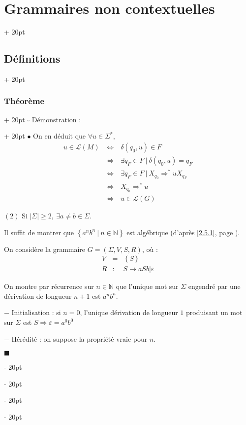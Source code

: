\documentclass[a4paper, 12pt, twoside]{article}
\newcommand{\N}{\mathbb{N}} %
\newcommand{\lr}[1]{\left( #1 \right)}
\newcommand{\set}[1]{\left\{ #1 \right\}}
\newcommand{\abs}[1]{\left\lvert #1 \right\rvert}
\newcommand{\ssi}{\ \Leftrightarrow \ }
\renewcommand{\ge}{\geqslant}
\newcommand{\ind}[1][20pt]{\advance\leftskip + #1}
\newcommand{\deind}[1][20pt]{\advance\leftskip - #1}
\newenvironment{indt}[2][20pt]{#2 \par \ind[#1]}{\par \deind} %
\newenvironment{proof}[1][{Démonstration :}]{\begin{indt}{$\square$ #1}}{$\blacksquare$ \end{indt}}
\begin{document}
\begin{indt}{\section{Grammaires non contextuelles}}
\begin{indt}{\subsection{Définitions}}
\begin{indt}{\subsubsection{Théorème}}
\begin{proof}
                    $\bullet$ On en déduit que $\forall u \in \Sigma^*$,
                    \[
                        \begin{array}{rcl}
                            u \in \mathcal L(M)
                            &\ssi& \delta(q_0, u) \in F
                            \\
                            &\ssi& \exists q_F \in F\ |\ \delta(q_0, u) = q_F
                            \\
                            &\ssi& \exists q_F \in F\ |\ X_{q_0} \Rightarrow^* uX_{q_F}
                            \\
                            &\ssi& X_{q_0} \Rightarrow^* u
                            \\
                            &\ssi& u \in \mathcal L(G)
                        \end{array}
                    \]

                    \vspace{12pt}
                    
                    $(2)$ Si $\abs \Sigma \ge 2,\ \exists a \neq b \in \Sigma$.

                    Il suffit de montrer que $\set{a^n b^n\ |\ n \in \N}$ est algébrique (d'après \ref{2.5.1}, page \pageref{2.5.1}).

                    On considère la grammaire $G = \lr{\Sigma, V, S, R}$, où :
                    \[
                        \begin{array}{rcl}
                            V &=& \set S
                            \\
                            R &:& S \rightarrow aSb | \varepsilon
                        \end{array}
                    \]

                    On montre par récurrence sur $n \in \N$ que l'unique mot sur $\Sigma$ engendré par une dérivation de longueur $n + 1$ est $a^n b^n$.

                    \vspace{6pt}
                    
                    $-$ Initialisation : si $n = 0$, l'unique dérivation de longueur $1$ produisant un mot sur $\Sigma$ est $S \Rightarrow \varepsilon = a^0 b^0$

                    \vspace{6pt}
                    
                    $-$ Hérédité : on suppose la propriété vraie pour $n$.


\end{proof}
\end{indt}
\end{indt}
\end{indt}
\end{document}
